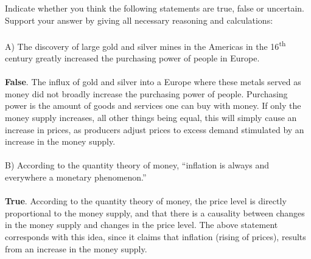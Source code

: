 \begin{homeworkProblem}[2]
    Indicate whether you think the following statements are true, false or 
    uncertain. Support your answer by giving all necessary reasoning and 
    calculations:
    \\ \\
    A) The discovery of large gold and silver mines in the Americas in the
    16\textsuperscript{th} century greatly increased the purchasing power
    of people in Europe.
    \\ \\
    \textbf{False}. The influx of gold and silver into a Europe where these 
    metals served as money did not broadly increase the purchasing power of 
    people. Purchasing power is the amount of goods and services one can buy
    with money. If only the money supply increases, all other things being 
    equal, this will simply cause an increase in prices, as producers adjust 
    prices to excess demand stimulated by an increase in the money supply.
    \\ \\
    
    B) According to the quantity theory of money, ``inflation is always
    and everywhere a monetary phenomenon.''
    \\ \\
    \textbf{True}. According to the quantity theory of money, the price
    level is directly proportional to the money supply, and that there is a 
    causality between changes in the money supply and changes in the price 
    level. The above statement corresponds with this idea, since it claims 
    that inflation (rising of prices), results from an increase in the money 
    supply. 
    
\end{homeworkProblem}